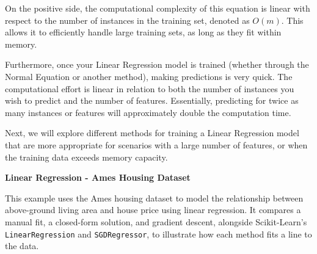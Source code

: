 \documentclass[12pt,letter]{article}
\begin{document}
On the positive side, the computational complexity of this equation is linear with respect to the number of instances in the training set, denoted as $O(m)$. This allows it to efficiently handle large training sets, as long as they fit within memory.

Furthermore, once your Linear Regression model is trained (whether through the Normal Equation or another method), making predictions is very quick. The computational effort is linear in relation to both the number of instances you wish to predict and the number of features. Essentially, predicting for twice as many instances or features will approximately double the computation time.

Next, we will explore different methods for training a Linear Regression model that are more appropriate for scenarios with a large number of features, or when the training data exceeds memory capacity.

\begin{example}
\textbf{Linear Regression - Ames Housing Dataset}

\noindent This example uses the Ames housing dataset to model the relationship between above-ground living area and house price using linear regression. It compares a manual fit, a closed-form solution, and gradient descent, alongside Scikit-Learn's \texttt{LinearRegression} and \texttt{SGDRegressor}, to illustrate how each method fits a line to the data.

\end{example}

%
%
%
%
%
\end{document}
